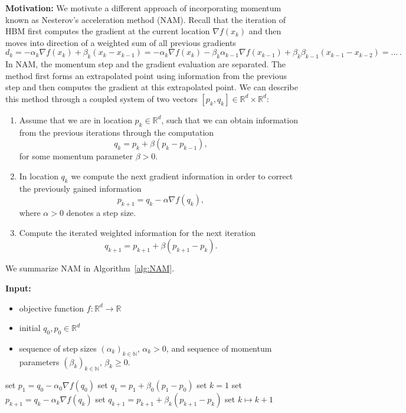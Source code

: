 \documentclass[12pt,openany]{book}
\theoremstyle{definition}
\theoremstyle{definition}
\newcommand{\N}{\mathbb{N}}
\newcommand{\R}{\mathbb{R}}
\begin{document}
\textbf{Motivation:} We motivate a different approach of incorporating momentum known as Nesterov's acceleration method (NAM).  Recall that the iteration of HBM first computes the gradient at the current location $\nabla f(x_k)$ and then moves into direction of a weighted sum of all previous gradients
\[d_k = -\alpha_k \nabla f(x_k) + \beta_k (x_k-x_{k-1}) = -\alpha_k \nabla f(x_k) -\beta_k \alpha_{k-1}\nabla f(x_{k-1}) + \beta_k\beta_{k-1}(x_{k-1}-x_{k-2})=\dots\, . \]
In NAM, the momentum step and the gradient evaluation are separated. The method first forms an extrapolated point using information from the previous step and then
computes the gradient at this extrapolated point. We can describe this method through a coupled system of two vectors $[p_k,q_k]\in\R^d\times\R^d$:
\begin{enumerate}
\item Assume that we are in location $p_k\in\R^d$, such that we can obtain information from the previous iterations through the computation
\[q_k = p_k + \beta (p_k-p_{k-1}), \]
for some momentum parameter $\beta>0$.
\item In location $q_k$ we compute the next gradient information in order to correct the previously gained information
\[p_{k+1} = q_k - \alpha\nabla f(q_k), \]
where $\alpha>0$ denotes a step size.
\item Compute the iterated weighted information for the next iteration \[q_{k+1} = p_{k+1} + \beta (p_{k+1} - p_k).\]
\end{enumerate}

We summarize NAM in Algorithm~\ref{alg:NAM}.
 \begin{algorithm}[htb!]
\begin{algorithmic}[1]
\State \textbf{Input:} \begin{itemize}
 \item objective function $f:\R^d\to\R$
 \item initial $q_0,p_0\in\R^d$
 \item sequence of step sizes $(\alpha_k)_{k\in\N}$, $\alpha_k>0$, and sequence of momentum parameters $(\beta_k)_{k\in\N}$, $\beta_k\ge0$.
 \end{itemize}
 \State set $p_1 = q_0 - \alpha_0 \nabla f(q_0)$
 \State set $q_1 = p_1 + \beta_0 (p_1-p_0)$
 \State set $k=1$
	\State set $p_{k+1} = q_k - \alpha_k \nabla f(q_k)$
	\State set $q_{k+1} = p_{k+1} + \beta_k (p_{k+1}-p_k)$ 
	\State set $k \mapsto k+1$
\EndWhile
\end{algorithmic}
 \caption{Nesterov's accelerated gradient descent method}\label{alg:NAM}
\end{algorithm}
\end{document}
